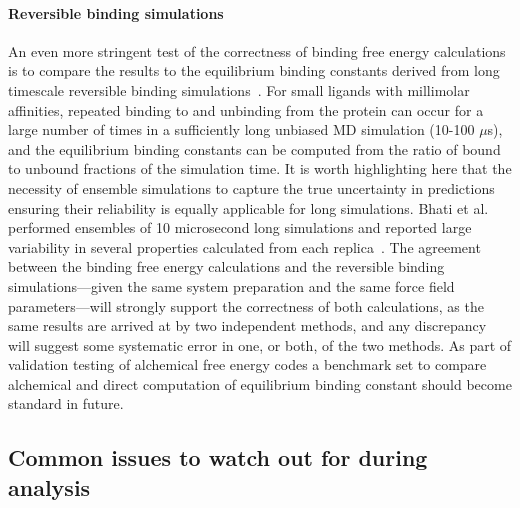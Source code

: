 \paragraph{Reversible binding simulations}
An even more stringent test of the correctness of binding free energy calculations is to compare the results to the equilibrium binding constants derived from long timescale reversible binding simulations~\cite{pan2017quantitative}. For small ligands with millimolar affinities, repeated binding to and unbinding from the protein can occur for a large number of times in a sufficiently long unbiased MD simulation (10-100 $\mu$s), and the equilibrium binding constants can be computed from the ratio of bound to unbound fractions of the simulation time. 
It is worth highlighting here that the necessity of ensemble simulations to capture the true uncertainty in predictions ensuring their reliability is equally applicable for long simulations. Bhati et al. performed ensembles of 10 microsecond long simulations and reported large variability in several properties calculated from each replica~\cite{bhati2023}.
The agreement between the binding free energy calculations and the reversible binding simulations---given the same system preparation and the same force field parameters---will strongly support the correctness of both calculations, as the same results are arrived at by two independent methods, and any discrepancy will suggest some systematic error in one, or both, of the two methods. As part of validation testing of alchemical free energy codes a benchmark set to compare alchemical and direct computation of equilibrium binding constant should become standard in future.

\subsection{Common issues to watch out for during analysis}

